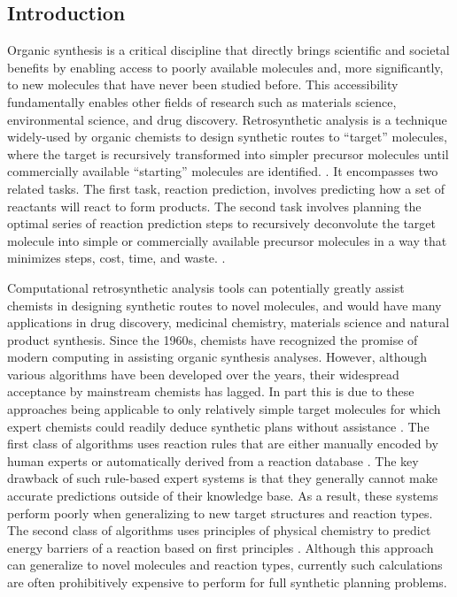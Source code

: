 \subsection{Introduction}
Organic synthesis is a critical discipline that directly brings scientific and societal benefits by enabling access to poorly available molecules and, more significantly, to new molecules that have never been studied before. This accessibility fundamentally enables other fields of research such as materials science, environmental science, and drug discovery. Retrosynthetic analysis is a technique widely-used by organic chemists to design synthetic routes to “target” molecules, where the target is recursively transformed into simpler precursor molecules until commercially available “starting” molecules are identified. \cite{corey1989logic, corey1967general, corey1969computer}. It encompasses two related tasks. The first task, reaction prediction, involves predicting how a set of reactants will react to form products. The second task involves planning the optimal series of reaction prediction steps to recursively deconvolute the target molecule into simple or commercially available precursor molecules in a way that minimizes steps, cost, time, and waste. \cite{wender2014toward, wender2015function}.

Computational retrosynthetic analysis tools can potentially greatly assist chemists in designing synthetic routes to novel molecules, and would have many applications in drug discovery, medicinal chemistry, materials science and natural product synthesis. Since the 1960s, chemists have recognized the promise of modern computing in assisting organic synthesis analyses. However, although various algorithms have been developed over the years, their widespread acceptance by mainstream chemists has lagged\cite{ley2015organic}. In part this is due to these approaches being applicable to only relatively simple target molecules for which expert chemists could readily deduce synthetic plans without assistance \cite{judson2009knowledge}. The first class of algorithms uses reaction rules that are either manually encoded by human experts or automatically derived from a reaction database \cite{szymkuc2016computer, pensak1977lhasa, segler2017modelling, corey1972techniques, corey1975general, corey1985computer, salatin1980computer, gasteiger1987new, satoh1995sophia, satoh1999novel, gelernter1990building, chen2009no, chen2008synthesis, law2009route, gothard2012rewiring, jorgensen1990cameo}. The key drawback of such rule-based expert systems is that they generally cannot make accurate predictions outside of their knowledge base. As a result, these systems perform poorly when generalizing to new target structures and reaction types. The second class of algorithms uses principles of physical chemistry to predict energy barriers of a reaction based on first principles \cite{zimmerman2013automated, wang2014discovering, wang2016automated, xu2009dynamics, rappoport2014complex, socorro2005robia, martinez2017ab}. Although this approach can generalize to novel molecules and reaction types, currently such calculations are often prohibitively expensive to perform for full synthetic planning problems.

